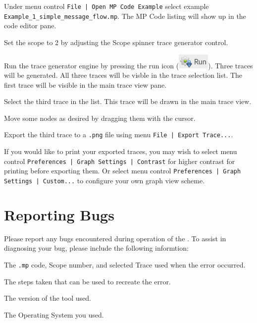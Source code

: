 \documentclass[11pt,fleqn]{article} %
\begin{document}
\begin{compactenum}
\item Under menu control \verb+File | Open MP Code Example+ select example\\
\verb+Example_1_simple_message_flow.mp+.
The MP Code listing will show up in the code editor pane.
\item Set the scope to 2 by adjusting the Scope spinner trace generator control.
\item Run the trace generator engine by pressing the run icon
(\includegraphics[scale=.4]{screenshots/run}).
Three traces will be generated. All three traces will be visble in the trace selection list. The first trace will be visible in the main trace view pane.
\item Select the third trace in the list. This trace will be drawn in the main trace view.
\item Move some nodes as desired by dragging them with the cursor.
\item Export the third trace to a \verb+.png+ file using menu \verb+File | Export Trace...+.
\item If you would like to print your exported traces, you may wish to select menu control \verb+Preferences | Graph Settings | Contrast+ for higher contrast for printing before exporting them. Or select menu control \verb+Preferences | Graph Settings | Custom...+ to configure your own graph view scheme.
\end{compactenum}

\section{Reporting Bugs}
Please report any bugs encountered during operation of the \mpgt.  To assist in diagnosing your bug, please include the following informtion:
\begin{compactitem}
\item The \verb+.mp+ code, Scope number, and selected Trace used when the error occurred.
\item The steps taken that can be used to recreate the error.
\item The version of the \ggui tool used.
\item The Operating System you used.
\end{compactitem}
\end{document}
